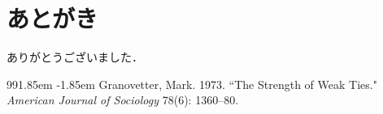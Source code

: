 \documentclass[a4paper,10pt,oneside,openany,uplatex]{jsbook}
\begin{document}



 \backmatter
\chapter{あとがき}
ありがとうございました．

\def\bibindent{1.85em}
\begin{thebibliography}{99\kern\bibindent}
\makeatletter
\def\@biblabel#1{}
\let\old@bibitem\bibitem
\def\bibitem#1{\old@bibitem{#1}\leavevmode\kern-\bibindent}
\makeatother
\small
\bibitem{}
Granovetter, Mark. 1973. ``The Strength of Weak Ties." \textit{American Journal of Sociology} 78(6): 1360--80.
\end{thebibliography}
\end{document}
